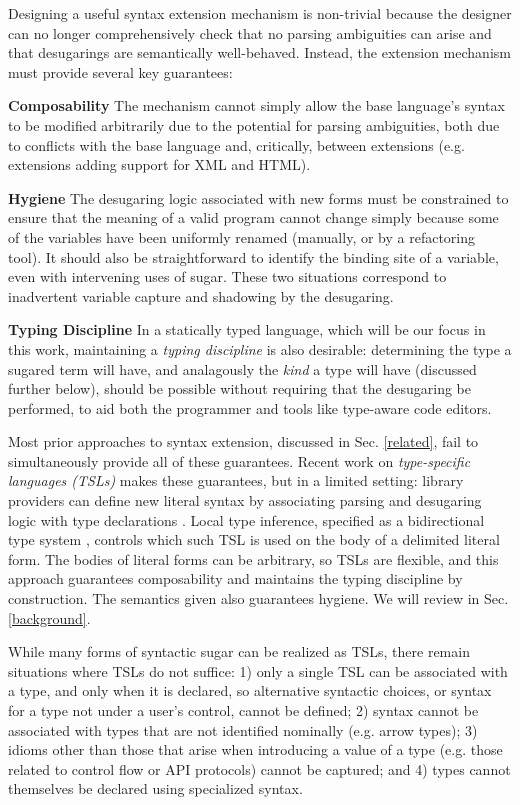 \documentclass{sig-alternate}[10pt]
\begin{document}
Designing a useful syntax extension mechanism is non-trivial because the designer can no longer  comprehensively check that no parsing ambiguities can arise and that desugarings are semantically well-behaved. Instead, the extension mechanism must provide several key guarantees:


\textbf{Composability} The mechanism cannot simply allow the base language's syntax to  be modified arbitrarily due to the potential for parsing ambiguities, both due to conflicts with the base language and, critically, between extensions (e.g. extensions adding support for XML and HTML).%


\textbf{Hygiene} The desugaring logic associated with new forms must be constrained to ensure that the meaning of a valid program cannot change simply because some of the variables have been uniformly renamed (manually, or by a refactoring tool). It should also be straightforward to identify the binding site of a variable, even with intervening uses of sugar. These two situations correspond to inadvertent variable capture and shadowing by the desugaring. 


\textbf{Typing Discipline} In a statically typed language, which will be our focus in this work, maintaining a \emph{typing discipline} is also desirable: determining the type a sugared term will have, and analagously the \emph{kind} a type will have (discussed further below), should be possible without requiring that the desugaring be performed, to aid both the programmer and tools like type-aware code editors. 

Most prior approaches to syntax extension, discussed in Sec. \ref{related}, fail to simultaneously provide all of these guarantees. Recent work on \emph{type-specific languages  (TSLs)} makes these guarantees, but in a limited setting: library providers can define new literal syntax by associating parsing and desugaring logic with type declarations \cite{TSLs}. Local type inference, specified as a bidirectional type system \cite{Pierce:2000:LTI:345099.345100}, controls which such TSL is used on the  body of a delimited literal form. The bodies of literal forms can be arbitrary, so TSLs are flexible, and this approach guarantees composability and maintains the typing discipline by construction. The semantics given also guarantees hygiene. We will review in Sec. \ref{background}. 

While many forms of syntactic sugar can be realized as TSLs, there remain situations where TSLs do not suffice: 1) only a single TSL can be associated with a type, and only when it is declared, so alternative syntactic choices, or syntax for a type not under a user's control, cannot be defined; 2) syntax cannot be associated with types that are not identified nominally (e.g. arrow types); 3) idioms other than those that arise when introducing a value of a type (e.g. those related to control flow or API protocols) cannot be captured; and 4) types cannot themselves be declared using specialized syntax. 
\end{document}
